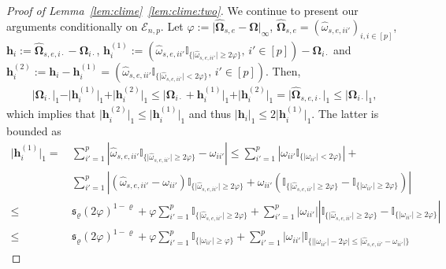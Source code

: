 \documentclass[11pt, a4paper]{article}
\newcommand{\mbf}{\mathbf}
\newcommand{\mc}{\mathcal}
\renewcommand{\l}{\left}
\renewcommand{\r}{\right}
\def\wh{\widehat}
\theoremstyle{definition}
\theoremstyle{definition}
\theoremstyle{definition}
\theoremstyle{definition}
\theoremstyle{definition}
\theoremstyle{remark}
\theoremstyle{definition}
\theoremstyle{definition}
\theoremstyle{definition}
\begin{document}
\begin{proof}[Proof of Lemma~\ref{lem:clime}~\ref{lem:clime:two}]
	We continue to present our arguments conditionally on $\mc E_{n, p}$.
	Let $\varphi := \vert \wh{\bm\Omega}_{s, e} - \bm\Omega \vert_\infty$, $\wh{\bm\Omega}_{s, e} = (\wh\omega_{s, e, ii'})_{i,i \in [p]}$, $\mbf h_i := \wh{\bm\Omega}_{s, e, i \cdot} - \bm\Omega_{i \cdot}$,
	$\mbf h^{(1)}_i := (\wh\omega_{s, e, ii'} \mathbb I_{\{\vert \wh\omega_{s, e, ii'} \vert \ge 2\varphi \}}, \, i' \in [p]) - \bm\Omega_{i \cdot}$ and $\mbf h^{(2)}_i := \mbf h_i - \mbf h^{(1)}_i = (\wh\omega_{s, e, ii'} \mathbb I_{\{\vert \wh\omega_{s, e, ii'} \vert < 2\varphi \}}, \, i' \in [p])$. Then,
	\begin{align*}
	\vert \bm\Omega_{i \cdot} \vert_1 - \vert \mbf h^{(1)}_i \vert_1 + \vert \mbf h^{(2)}_i \vert_1
	\le \vert \bm\Omega_{i \cdot} + \mbf h^{(1)}_i \vert_1 + \vert \mbf h^{(2)}_i \vert_1
	= \vert \wh{\bm\Omega}_{s, e, i \cdot} \vert_1 \le \vert \bm\Omega_{i \cdot} \vert_1,
	\end{align*}
	which implies that $\vert \mbf h^{(2)}_i \vert_1 \le \vert \mbf h^{(1)}_i \vert_1$
	and thus $\vert \mbf h_i \vert_1 \le 2 \vert \mbf h^{(1)}_i \vert_1$.
	The latter is bounded as
	\begin{align*}
	\vert \mbf h^{(1)}_i \vert_1 
	=& \, \sum_{i' = 1}^p \l\vert \wh\omega_{s, e, ii'} \mathbb I_{\{\vert \wh\omega_{s, e, ii'} \vert \ge 2\varphi\}} - \omega_{ii'} \r\vert
	\le 
	\sum_{i' = 1}^p \l\vert \omega_{ii'} \mathbb I_{\{\vert \omega_{ii'} \vert < 2\varphi\}} \r\vert
	+
	\\
	& \, \sum_{i' = 1}^p \l\vert \l(\wh\omega_{s, e, ii'} - \omega_{ii'}\r) 
	\mathbb I_{\{\vert \wh\omega_{s, e, ii'} \vert \ge 2\varphi\}}
	+
	\omega_{ii'} \l(\mathbb I_{\{\vert \wh\omega_{s, e, ii'} \vert \ge 2\varphi\}} -
	\mathbb I_{\{\vert \omega_{ii'} \vert \ge 2\varphi\}} \r)\r\vert
	\\
	\le&  \, \mathfrak{s}_\varrho (2\varphi)^{1 - \varrho} + 
	\varphi \sum_{i' = 1}^p \mathbb I_{\{\vert \wh\omega_{s, e, ii'} \vert \ge 2\varphi\}}
	+ \sum_{i' = 1}^p \vert \omega_{ii'} \vert \l\vert
	\mathbb I_{\{\vert \wh\omega_{s, e, ii'} \vert \ge 2\varphi\}} -
	\mathbb I_{\{\vert \omega_{ii'} \vert \ge 2\varphi\}} \r\vert
	\\
	\le&  \, \mathfrak{s}_\varrho (2\varphi)^{1 - \varrho} + 
	\varphi \sum_{i' = 1}^p \mathbb I_{\{\vert \omega_{ii'} \vert \ge \varphi\}}
	+ \sum_{i' = 1}^p \vert \omega_{ii'} \vert
	\mathbb I_{\{\vert \vert \omega_{ii'} \vert  - 2\varphi \vert \le \vert \wh\omega_{s, e, ii'} - \omega_{ii'} \vert\}}

\end{align*}
\end{proof}
\end{document}
